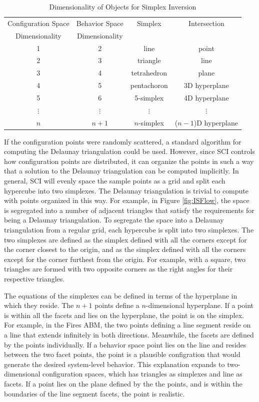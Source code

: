 \begin{table}[ht]
  \caption{Dimensionality of Objects for Simplex Inversion}
  \centering
  \begin{tabular}{c c c c}
    \hline \hline
    Configuration Space & Behavior Space & Simplex & Intersection \\
    Dimensionality      & Dimensionality &         &  \\
    \hline
    1 & 2 & line & point \\
    2 & 3 & triangle & line \\
    3 & 4 & tetrahedron & plane \\
    4 & 5 & pentachoron & 3D hyperplane \\
    5 & 6 & 5-simplex & 4D hyperplane \\
    $\vdots$ & $\vdots$ & $\vdots$ & $\vdots$ \\
    $n$ & $n + 1$ & $n$-simplex & ($n-1$)D hyperplane \\
    \hline
  \end{tabular}
  \label{table:dims}
\end{table}

If the configuration points were randomly scattered, a standard algorithm for computing the Delaunay triangulation could be used.
However, since SCI controls how configuration points are distributed, it can organize the points in such a way that a solution to the Delaunay triangulation can be computed implicitly.
In general, SCI will evenly space the sample points as a grid and split each hypercube into two simplexes.
The Delaunay triangulation is trivial to compute with points organized in this way.
For example, in Figure \ref{fig:ISFlow}, the space is segregated into a number of adjacent triangles that satisfy the requirements for being a Delaunay triangulation.
To segregate the space into a Delaunay triangulation from a regular grid, each hypercube is split into two simplexes.
The two simplexes are defined as the simplex defined with all the corners except for the corner closest to the origin, and as the simplex defined with all the corners except for the corner furthest from the origin.
For example, with a square, two triangles are formed with two opposite corners as the right angles for their respective triangles.

The equations of the simplexes can be defined in terms of the hyperplane in which they reside.
The $n+1$ points define a $n$-dimensional hyperplane.
If a point is within all the facets and lies on the hyperplane, the point is on the simplex.
For example, in the Fires ABM, the two points defining a line segment reside on a line that extends infinitely in both directions.
Meanwhile, the facets are defined by the points individually.
If a behavior space point lies on the line and resides between the two facet points, the point is a plausible configration that would generate the desired system-level behavior.
This explanation expands to two-dimensional configuration spaces, which has triangles as simplexes and line as facets.
If a point lies on the plane defined by the the points, and is within the boundaries of the line segment facets, the point is realistic.


